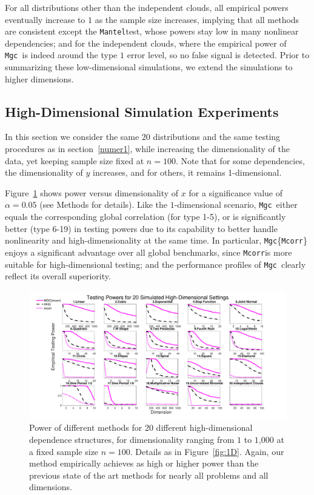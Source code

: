 \documentclass[11pt]{article}
\providecommand{\sct}[1]{{\sc \texttt{#1}}}
\newcommand{\Mgc}{\sct{Mgc}}
\newcommand{\Mcorr}{\sct{Mcorr}}
\newcommand{\Mantel}{\sct{Mantel}}
\begin{document}
For all distributions other than the independent clouds, all empirical powers eventually increase to $1$ as the sample size increases, implying that all methods are consistent except the \Mantel test, whose powers stay low in many nonlinear dependencies; and for the independent clouds, where the empirical power of \Mgc~is indeed around the type $1$ error level, so no false signal is detected. Prior to summarizing these low-dimensional simulations, we extend the simulations to higher dimensions.


\subsection{High-Dimensional Simulation Experiments}
\label{numer2}
In this section we consider the same $20$ distributions and the same testing procedures as in section~\ref{numer1}, while increasing the  dimensionality of the data, yet keeping sample size fixed at $n=100$. Note that for some dependencies, the dimensionality of $y$ increases, and for others, it remains 1-dimensional.

Figure~\ref{fig:nD} shows power versus dimensionality of $x$ for a significance value of $\alpha=0.05$ (see Methods for details).  
Like the $1$-dimensional scenario, \Mgc~either equals the corresponding global correlation (for type 1-5), or is significantly better (type 6-19) in testing powers due to its capability to better handle nonlinearity and high-dimensionality at the same time. In particular, \Mgc\{\Mcorr\} enjoys a significant advantage over all global benchmarks, since \Mcorr is more suitable for high-dimensional testing; and the performance profiles of \Mgc~clearly reflect its overall superiority. 


\begin{figure}[htbp]
\includegraphics[width=1.0\textwidth]{Figures/FigHDPower}
\caption{Power of different methods for 20 different high-dimensional dependence structures, for dimensionality ranging from $1$ to $1$,$000$ at a fixed sample size $n=100$.  Details as in Figure~\ref{fig:1D}.
Again, our method empirically achieves as high or higher power than the previous state of the art methods for nearly all problems and all dimensions.
}
\label{fig:nD}
\end{figure}
\end{document}
